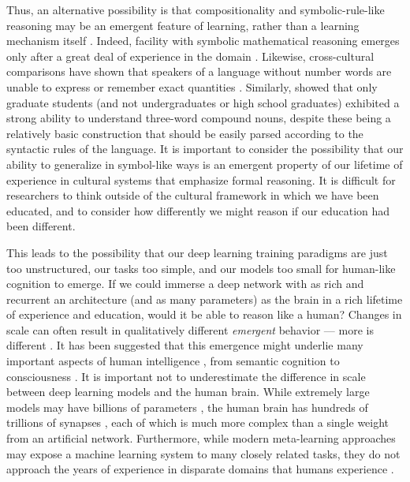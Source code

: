 Thus, an alternative possibility is that compositionality and symbolic-rule-like reasoning may be an emergent feature of learning, rather than a learning mechanism itself \citep{McClelland1999, McClelland2002, McClelland2010, McClelland2010a}. Indeed, facility with symbolic mathematical reasoning emerges only after a great deal of experience in the domain \citep{Burger1986, McClelland2016}. Likewise, cross-cultural comparisons have shown that speakers of a language without number words are unable to express or remember exact quantities \citep{Frank2008}. Similarly, \citet{Gleitman1970} showed that only graduate students (and not undergraduates or high school graduates) exhibited a strong ability to understand three-word compound nouns, despite these being a relatively basic construction that should be easily parsed according to the syntactic rules of the language. It is important to consider the possibility that our ability to generalize in symbol-like ways is an emergent property of our lifetime of experience in cultural systems that emphasize formal reasoning. It is difficult for researchers to think outside of the cultural framework in which we have been educated, and to consider how differently we might reason if our education had been different. \par 
This leads to the possibility that our deep learning training paradigms are just too unstructured, our tasks too simple, and our models too small for human-like cognition to emerge. If we could immerse a deep network with as rich and recurrent an architecture (and as many parameters) as the brain in a rich lifetime of experience and education, would it be able to reason like a human? Changes in scale can often result in qualitatively different \emph{emergent} behavior --- more is different \citep{Anderson1972}. It has been suggested that this emergence might underlie many important aspects of human intelligence \citep{McClelland2010a}, from semantic cognition \citep{Rogers2008, Saxe2019} to consciousness \citep{Chalmers2006}. It is important not to underestimate the difference in scale between deep learning models and the human brain. While extremely large models may have billions of parameters \citep[e.g.][]{Radford2019}, the human brain has hundreds of trillions of synapses \citep{Drachman2005}, each of which is much more complex than a single weight from an artificial network. Furthermore, while modern meta-learning approaches may expose a machine learning system to many closely related tasks, they do not approach the years of experience in disparate domains that humans experience \citep[c.f.][]{Mitchell2018}.\par 
